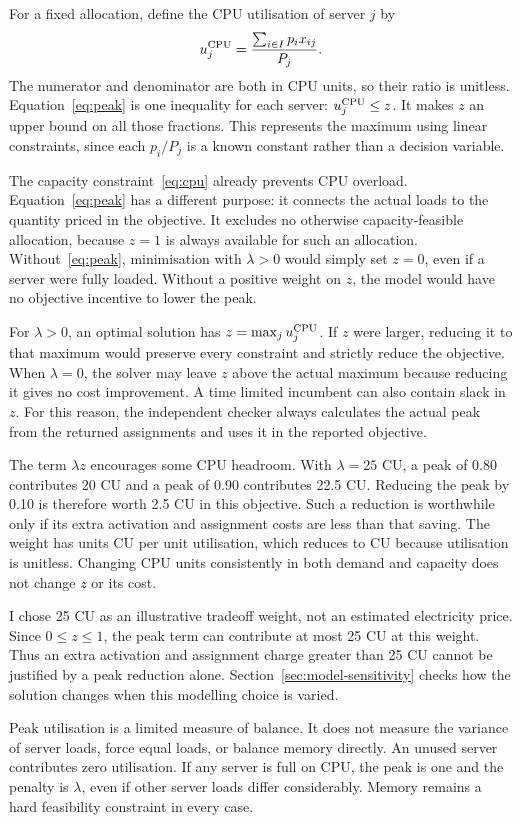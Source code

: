\documentclass[10pt,a4paper]{article}
\begin{document}
For a fixed allocation, define the CPU utilisation of server $j$ by
\[
u^{\rm CPU}_j=\frac{\sum_{i\in I}p_ix_{ij}}{P_j}.
\]
The numerator and denominator are both in CPU units, so their ratio is
unitless. Equation~\eqref{eq:peak} is one inequality for each server:
$u^{\rm CPU}_j\leq z$. It makes $z$ an upper bound on all those fractions.
This represents the maximum using linear constraints, since each $p_i/P_j$
is a known constant rather than a decision variable.

The capacity constraint~\eqref{eq:cpu} already prevents CPU overload.
Equation~\eqref{eq:peak} has a different purpose: it connects the actual loads
to the quantity priced in the objective. It excludes no otherwise
capacity-feasible allocation, because $z=1$ is always available for such an
allocation. Without~\eqref{eq:peak}, minimisation with $\lambda>0$ would simply
set $z=0$, even if a server were fully loaded. Without a positive weight on
$z$, the model would have no objective incentive to lower the peak.

For $\lambda>0$, an optimal solution has
$z=\max_j u^{\rm CPU}_j$. If $z$ were larger, reducing it to that maximum would
preserve every constraint and strictly reduce the objective. When $\lambda=0$,
the solver may leave $z$ above the actual maximum because reducing it gives no
cost improvement. A time limited incumbent can also contain slack in $z$.
For this reason, the independent checker always calculates the actual peak
from the returned assignments and uses it in the reported objective.

The term $\lambda z$ encourages some CPU headroom. With $\lambda=25$ CU, a
peak of 0.80 contributes 20 CU and a peak of 0.90 contributes 22.5 CU.
Reducing the peak by 0.10 is therefore worth 2.5 CU in this objective. Such a
reduction is worthwhile only if its extra activation and assignment costs are
less than that saving. The weight has units CU per unit utilisation, which
reduces to CU because utilisation is unitless. Changing CPU units consistently
in both demand and capacity does not change $z$ or its cost.

I chose 25 CU as an illustrative tradeoff weight, not an estimated electricity
price. Since $0\leq z\leq1$, the peak term can contribute at most 25 CU
at this weight. Thus an extra activation and assignment charge greater than
25 CU cannot be justified by a peak reduction alone. Section~\ref{sec:model-sensitivity} checks how
the solution changes when this modelling choice is varied.

Peak utilisation is a limited measure of balance. It does not measure the
variance of server loads, force equal loads, or balance memory directly.
An unused server contributes zero utilisation. If any server is full on CPU,
the peak is one and the penalty is $\lambda$, even if other server loads differ
considerably. Memory remains a hard feasibility constraint in every case.
\end{document}
